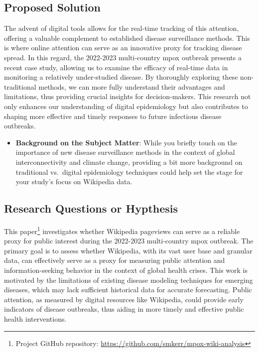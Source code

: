 \documentclass[
  12pt,
]{article}
\providecommand{\tightlist}{%
  \setlength{\itemsep}{0pt}\setlength{\parskip}{0pt}}\usepackage{longtable,booktabs,array}
\begin{document}
\subsection{Proposed Solution}\label{proposed-solution}

The advent of digital tools allows for the real-time tracking of this
attention, offering a valuable complement to established disease
surveillance methods. This is where online attention can serve as an
innovative proxy for tracking disease spread. In this regard, the
2022-2023 multi-country mpox outbreak presents a recent case study,
allowing us to examine the efficacy of real-time data in monitoring a
relatively under-studied disease. By thoroughly exploring these
non-traditional methods, we can more fully understand their advantages
and limitations, thus providing crucial insights for decision-makers.
This research not only enhances our understanding of digital
epidemiology but also contributes to shaping more effective and timely
responses to future infectious disease outbreaks.

\begin{itemize}
\tightlist
\item
  \textbf{Background on the Subject Matter}: While you briefly touch on
  the importance of new disease surveillance methods in the context of
  global interconnectivity and climate change, providing a bit more
  background on traditional vs.~digital epidemiology techniques could
  help set the stage for your study's focus on Wikipedia data.
\end{itemize}

\subsection{Research Questions or
Hypthesis}\label{research-questions-or-hypthesis}

This paper\footnote{Project GitHub repository:
  \url{https://github.com/smkerr/mpox-wiki-analysis}} investigates
whether Wikipedia pageviews can serve as a reliable proxy for public
interest during the 2022-2023 multi-country mpox outbreak. The primary
goal is to assess whether Wikipedia, with its vast user base and
granular data, can effectively serve as a proxy for measuring public
attention and information-seeking behavior in the context of global
health crises. This work is motivated by the limitations of existing
disease modeling techniques for emerging diseases, which may lack
sufficient historical data for accurate forecasting. Public attention,
as measured by digital resources like Wikipedia, could provide early
indicators of disease outbreaks, thus aiding in more timely and
effective public health interventions.
\end{document}
